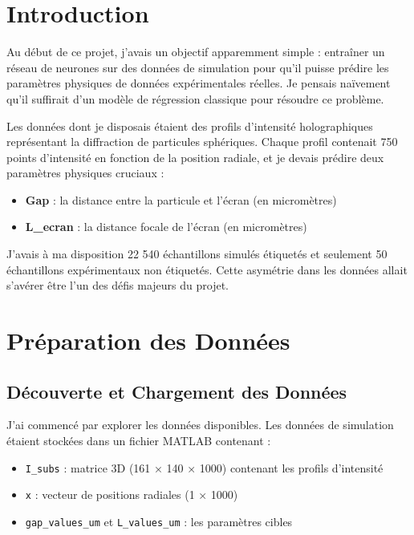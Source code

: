 \documentclass[11pt,a4paper]{article}
\begin{document}
\tableofcontents
\newpage

\section{Introduction}

Au début de ce projet, j'avais un objectif apparemment simple : entraîner un réseau de neurones sur des données de simulation pour qu'il puisse prédire les paramètres physiques de données expérimentales réelles. Je pensais naïvement qu'il suffirait d'un modèle de régression classique pour résoudre ce problème.

Les données dont je disposais étaient des profils d'intensité holographiques représentant la diffraction de particules sphériques. Chaque profil contenait 750 points d'intensité en fonction de la position radiale, et je devais prédire deux paramètres physiques cruciaux :
\begin{itemize}
    \item \textbf{Gap} : la distance entre la particule et l'écran (en micromètres)
    \item \textbf{L\_ecran} : la distance focale de l'écran (en micromètres)
\end{itemize}

J'avais à ma disposition 22 540 échantillons simulés étiquetés et seulement 50 échantillons expérimentaux non étiquetés. Cette asymétrie dans les données allait s'avérer être l'un des défis majeurs du projet.

\section{Préparation des Données}

\subsection{Découverte et Chargement des Données}

J'ai commencé par explorer les données disponibles. Les données de simulation étaient stockées dans un fichier MATLAB contenant :
\begin{itemize}
    \item \texttt{I\_subs} : matrice 3D (161 × 140 × 1000) contenant les profils d'intensité
    \item \texttt{x} : vecteur de positions radiales (1 × 1000)
    \item \texttt{gap\_values\_um} et \texttt{L\_values\_um} : les paramètres cibles
\end{itemize}
\end{document}
